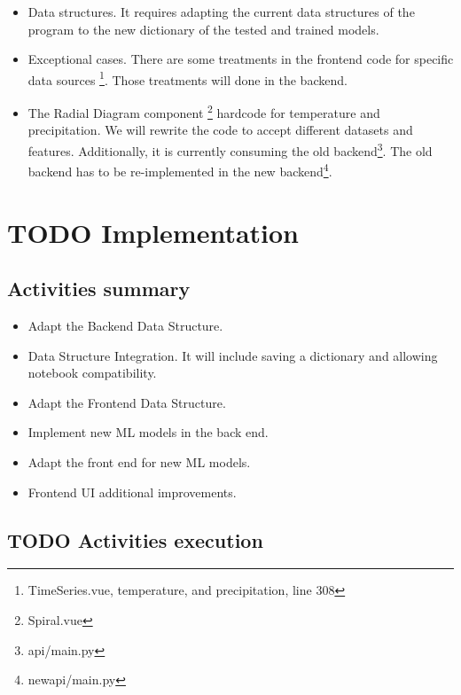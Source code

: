 \documentclass[a4paper]{article}
\begin{document}
\begin{itemize}
\item Data structures. It requires adapting the current data structures of the program to the new dictionary of the tested and trained models.

\item Exceptional cases. There are some treatments in the frontend code for specific data sources \footnote{TimeSeries.vue, temperature, and precipitation, line 308}. Those treatments will done in the backend.

\item The Radial Diagram component \footnote{Spiral.vue} hardcode for temperature and precipitation. We will rewrite the code to accept different datasets and features. Additionally, it is currently consuming the old backend\footnote{api/main.py}. The old backend has to be re-implemented in the new backend\footnote{new\textunderscore api/main.py}.
\end{itemize}

\section{{\bfseries\sffamily TODO} Implementation}
\label{sec:org5ca9bc4}

\subsection{Activities summary}
\label{sec:org1358ce5}

\begin{itemize}
\item Adapt the Backend Data Structure.

\item Data Structure Integration. It will include saving a dictionary and allowing notebook compatibility.

\item Adapt the Frontend Data Structure.

\item Implement new ML models in the back end.

\item Adapt the front end for new ML models.

\item Frontend UI additional improvements.
\end{itemize}

\subsection{{\bfseries\sffamily TODO} Activities execution}
\label{sec:org5c8abe1}
\end{document}

